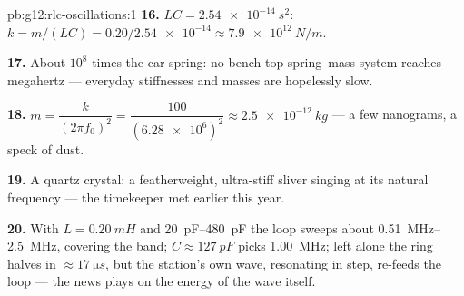 \begin{solution}{pb:g12:rlc-oscillations:1}
\textbf{16.} $LC = \qty{2.54e-14}{s^2}$: $k = m/(LC) =
0.20/\num{2.54e-14} \approx \qty{7.9e12}{N/m}$.

\textbf{17.} About $10^8$ times the car spring: no bench-top
spring--mass system reaches megahertz --- everyday stiffnesses and
masses are hopelessly slow.

\textbf{18.} $m = \dfrac{k}{(2\pi f_0)^2} = \dfrac{100}
{(\num{6.28e6})^2} \approx \qty{2.5e-12}{kg}$ --- a few nanograms, a
speck of dust.

\textbf{19.} A quartz crystal: a featherweight, ultra-stiff sliver
singing at its natural frequency --- the timekeeper met earlier this
year.

\textbf{20.} With $L = \qty{0.20}{mH}$ and \qtyrange{20}{480}{pF} the
loop sweeps about \qtyrange{0.51}{2.5}{MHz}, covering the band;
$C \approx \qty{127}{pF}$ picks \qty{1.00}{MHz}; left alone the ring
halves in $\approx \qty{17}{\micro s}$, but the station's own wave,
resonating in step, re-feeds the loop --- the news plays on the energy
of the wave itself.
\end{solution}
